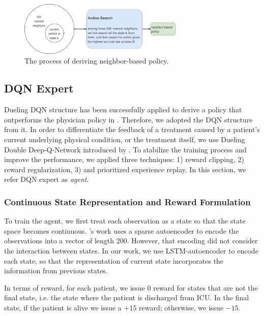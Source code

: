 \documentclass[letterpaper]{article}
\begin{document}
\begin{figure}[H]
\centering
\includegraphics[width=0.7\textwidth]{figures/kernel_policy.png}
\caption{\label{fig:kernel_policy} The process of deriving neighbor-based policy.}
\end{figure}

\subsection{DQN Expert}
Dueling DQN structure has been successfully applied to derive a policy that outperforms the physician policy in \cite{DBLP:journals/corr/RaghuKCSG17}. Therefore, we adopted the DQN structure from it. In order to differentiate the feedback of a treatment caused by a patient's current underlying physical condition, or the treatment itself, we use Dueling Double Deep-Q-Network introduced by \cite{wang2015dueling}. To stabilize the training process and improve the performance, we applied three techniques: 1) reward clipping, 2) reward regularization, 3) and prioritized experience replay. In this section, we refer DQN expert as \textit{agent}.

\subsubsection{Continuous State Representation and Reward Formulation}
\label{section:reward_formulation}

To train the agent, we first treat each observation as a state so that the state space becomes continuous. \cite{DBLP:journals/corr/RaghuKCSG17}'s work uses a sparse autoencoder to encode the observations into a vector of length 200. However, that encoding did not consider the interaction between states. In our work, we use LSTM-autoencoder to encode each state, so that the representation of current state incorporates the information from previous states. 

In terms of reward, for each patient, we issue $0$ reward for states that are not the final state, i.e. the state where the patient is discharged from ICU. In the final state, if the patient is alive we issue a $+15$ reward; otherwise, we issue $-15$.
\end{document}
